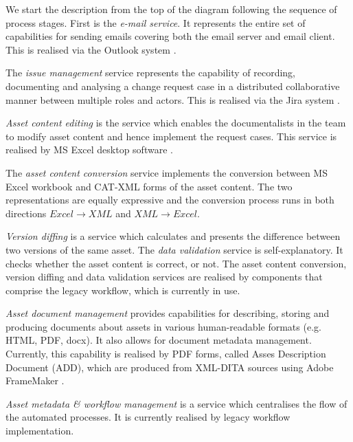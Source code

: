 
	We start the description from the top of the diagram following the sequence of process stages. First is the \textit{e-mail service}. It represents the entire set of capabilities for sending emails covering both the email server and email client. This is realised via the Outlook system \citep{outlook}. 
	
	The \textit{issue management} service represents the capability of recording, documenting and analysing a change request case in a distributed collaborative manner between multiple roles and actors. This is realised via the Jira system \citep{jira}. 
	
	\textit{Asset content editing} is the service which enables the documentalists in the team to modify asset content and hence implement the request cases. This service is realised by MS Excel desktop software \citep{excel}.
	
	The \textit{asset content conversion} service implements the conversion between MS Excel workbook and CAT-XML forms of the asset content. The two representations are equally expressive and the conversion process runs in both directions $ Excel \rightarrow XML $ and $XML \rightarrow Excel $.
	
	\textit{Version diffing} is a service which calculates and presents the difference between two versions of the same asset. The \textit{data validation} service is self-explanatory. It checks whether the asset content is correct, or not. The asset content conversion, version diffing and data validation services are realised by components that comprise the legacy workflow, which is currently in use.
	
	\textit{Asset document management} provides capabilities for describing, storing and producing documents about assets in various human-readable formats (e.g. HTML, PDF, docx). It also allows for document metadata management. Currently, this capability is realised by PDF forms, called Asses Description Document (ADD), which are produced from XML-DITA sources \citep{dita-day2005introduction, dita-spec} using Adobe FrameMaker \citep{framemaker}. 
	
	\textit{Asset metadata \& workflow management} is a service which centralises the flow of the automated processes. It is currently realised by legacy workflow implementation. 
	
